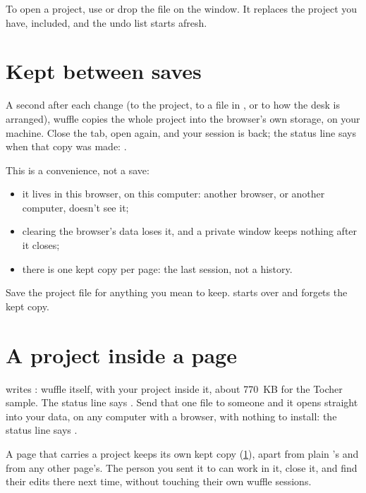 To open a project, use  or drop the file on the window. It replaces
the project you have,  included, and the undo list starts afresh.

\section{Kept between saves}\label{sec:autosave}

A second after each change (to the project, to a file in , or to how the desk is arranged), wuffle copies the whole project
into the browser's own storage, on your machine. Close the tab, open  again, and your
session is back; the status line says when that copy was made: .

This is a convenience, not a save:

\begin{itemize}
\item it lives in this browser, on this computer: another browser, or another computer, doesn't see it;
\item clearing the browser's data loses it, and a private window keeps nothing after it closes;
\item there is one kept copy per page: the last session, not a history.
\end{itemize}

Save the project file for anything you mean to keep.  starts over and forgets the
kept copy.

\section{A project inside a page}\label{sec:save-page}

 writes : wuffle itself,
with your project inside it, about 770~KB for the Tocher sample. The status line says . Send that one file to someone and it opens straight
into your data, on any computer with a browser, with nothing to install: the status line says .

A page that carries a project keeps its own kept copy (\cref{sec:autosave}), apart from plain
's and from any other page's. The person you sent it to can work in it, close it, and
find their edits there next time, without touching their own wuffle sessions.

